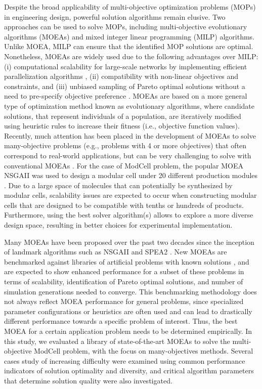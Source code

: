 Despite the broad applicability of multi-objective optimization problems (MOPs) in engineering design, powerful solution algorithms remain elusive. Two approaches can be used to solve MOPs, including multi-objective evolutionary algorithms (MOEAs) and mixed integer linear programming (MILP) algorithms.
Unlike MOEA, MILP can ensure that the identified MOP solutions are optimal.
Nonetheless, MOEAs are widely used due to the following advantages over MILP: (i) computational scalability for large-scale networks by implementing efficient parallelization algorithms \cite{coello2007}, (ii) compatibility with non-linear objectives and constraints, and (iii) unbiased sampling of Pareto optimal solutions without a need to pre-specify objective preference \cite{marler2004}.
MOEAs are based on a more general type of optimization method known as evolutionary algorithms, where candidate solutions, that represent individuals of a population, are iteratively modified using heuristic rules to increase their fitness (i.e., objective function values).
Recently, much attention has been placed in the development of MOEAs to solve many-objective problems (e.g., problems with 4 or more objectives) that often correspond to real-world applications, but can be very challenging to solve with conventional MOEAs \cite{li2015}.
For the case of ModCell problem, the popular MOEA NSGAII \cite{matlabdoc, deb2001} was used to design a modular cell under 20 different production modules \cite{garcia2019}.
Due to a large space of molecules that can potentially be synthesized by modular cells, scalability issues are expected to occur when constructing modular cells that are designed to be compatible with tenths or hundreds of products.
Furthermore, using the best solver algorithm(s) allows to explore a more diverse design space, resulting in better choices for experimental implementation.

Many MOEAs have been proposed over the past two decades since the inception of landmark algorithms such as NSGAII \cite{deb2002} and SPEA2 \cite{zitzler2001}.
New MOEAs are benchmarked against libraries of artificial problems with known solutions \cite{zitzler2000, deb2002b}, and are expected to show enhanced performance for a subset of these problems in terms of scalability, identification of Pareto optimal solutions, and number of simulation generations needed to converge.
This benchmarking methodology does not always reflect MOEA performance for general problems, since specialized parameter configurations or heuristics are often used and can lead to drastically different performance towards a specific problem of interest.
Thus, the best MOEA for a certain application problem needs to be determined empirically.
In this study, we evaluated a library of state-of-the-art MOEAs to solve the multi-objective ModCell problem, with the focus on many-objectives methods.
Several cases study of increasing difficulty were examined using common performance indicators of solution optimality and diversity, and critical algorithm parameters that determine solution quality were also investigated.

